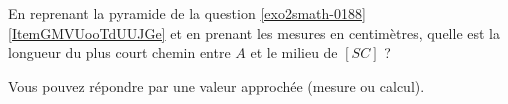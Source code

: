 
\begin{exercice}\label{exo2smath-0187}

    En reprenant la pyramide de la question \ref{exo2smath-0188}\ref{ItemGMVUooTdUUJGe} et en prenant les mesures en centimètres, quelle est la longueur du plus court chemin entre \( A\) et le milieu de \( [SC]\) ?

    Vous pouvez répondre par une valeur approchée (mesure ou calcul).

\end{exercice}
